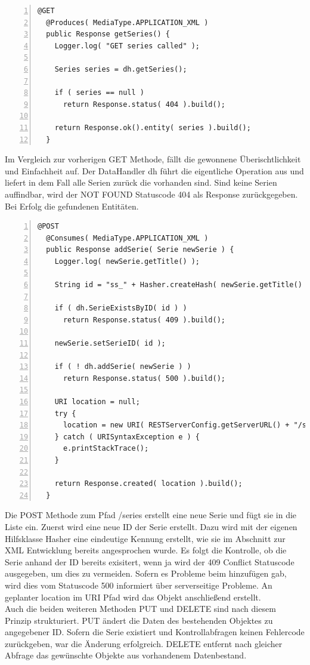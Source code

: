 \begin{lstlisting}[basicstyle=\ttfamily,numbers=left,numberstyle=\footnotesize\ttfamily,backgroundcolor=\color{source},label=seriesservice,caption= GET Methode /series ]
  @GET
  @Produces( MediaType.APPLICATION_XML )
  public Response getSeries() {
    Logger.log( "GET series called" );

    Series series = dh.getSeries();

    if ( series == null )
      return Response.status( 404 ).build();

    return Response.ok().entity( series ).build();
  }
\end{lstlisting}

Im Vergleich zur vorherigen GET Methode, fällt die gewonnene Überischtlichkeit und Einfachheit auf. Der DataHandler dh führt die eigentliche Operation aus und liefert in dem Fall alle Serien zurück die vorhanden sind. Sind keine Serien auffindbar, wird der NOT FOUND Statuscode 404 als Response zurückgegeben. Bei Erfolg die gefundenen Entitäten.

\begin{lstlisting}[basicstyle=\ttfamily,numbers=left,numberstyle=\footnotesize\ttfamily,backgroundcolor=\color{source},label=seriesservice,caption= POST Methode /series ]
@POST
  @Consumes( MediaType.APPLICATION_XML )
  public Response addSerie( Serie newSerie ) {
    Logger.log( newSerie.getTitle() );

    String id = "ss_" + Hasher.createHash( newSerie.getTitle() );

    if ( dh.SerieExistsByID( id ) )
      return Response.status( 409 ).build();

    newSerie.setSerieID( id );

    if ( ! dh.addSerie( newSerie ) )
      return Response.status( 500 ).build();

    URI location = null;
    try {
      location = new URI( RESTServerConfig.getServerURL() + "/series/" + id );
    } catch ( URISyntaxException e ) {
      e.printStackTrace();
    }

    return Response.created( location ).build();
  }
\end{lstlisting}

Die POST Methode zum Pfad /series erstellt eine neue Serie und fügt sie in die Liste ein. Zuerst wird eine neue ID der Serie erstellt. Dazu wird mit der eigenen Hilfsklasse Hasher eine eindeutige Kennung erstellt, wie sie im Abschnitt zur XML Entwicklung bereits angesprochen wurde. Es folgt die Kontrolle, ob die Serie anhand der ID bereits exisitert, wenn ja wird der 409 Conflict Statuscode ausgegeben, um dies zu vermeiden. Sofern es Probleme beim hinzufügen gab, wird dies vom Statuscode 500 informiert über serverseitige Probleme. An geplanter location im URI Pfad wird das Objekt anschließend erstellt.\\
Auch die beiden weiteren Methoden PUT und DELETE sind nach diesem Prinzip strukturiert. PUT ändert die Daten des bestehenden Objektes zu angegebener ID. Sofern die Serie existiert und Kontrollabfragen keinen Fehlercode zurückgeben, war die Änderung erfolgreich. DELETE entfernt nach gleicher Abfrage das gewünschte Objekte aus vorhandenem Datenbestand.\\

